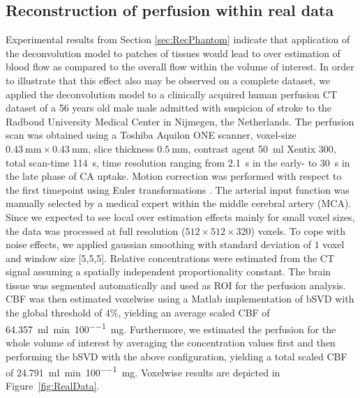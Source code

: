 \documentclass[journal,twocolumn]{IEEEtran}
\begin{document}
	
	\subsection{Reconstruction of perfusion within real data}\label{sec:RealData}
 	Experimental results from Section \ref{sec:RecPhantom} indicate that application of the deconvolution model to patches of tissues would lead to over estimation of blood flow as compared to the overall flow within the volume of interest.
	In order to illustrate that this effect also may be observed on a complete dataset, we applied the deconvolution model to a clinically acquired human perfusion CT dataset of a 56 years old male male admitted with suspicion of stroke to the Radboud University Medical Center in Nijmegen, the Netherlands.
	The perfusion scan was obtained using a Toshiba Aquilon ONE scanner, voxel-size $\SI{0.43}{\milli\meter}\times\SI{0.43}{\milli\meter}$, slice thickness $\SI{0.5}{\milli\meter}$, contrast agent \SI{50}{\milli\litre} Xentix 300, total scan-time \SI{114}{\second}, time resolution ranging from \SI{2.1}{\second} in the early- to \SI{30}{\second} in the late phase of CA uptake.
	Motion correction was performed with respect to the first timepoint using Euler transformations \cite{Mendrik11}.
	The arterial input function was manually selected by a medical expert within the middle cerebral artery (MCA).
	Since we expected to see local over estimation effects mainly for small voxel sizes, the data was processed at full resolution ($512\times512\times320$) voxels. 
	To cope with noise effects, we applied gaussian smoothing with standard deviation of $1$ voxel and window size [5,5,5].
	Relative concentrations were estimated from the CT signal assuming a spatially independent proportionality constant. 
	The brain tissue was segmented automatically and used as ROI for the perfusion analysis.
	CBF was then estimated voxelwise using a Matlab implementation of bSVD with the global threshold of $4\%$, yielding an average scaled CBF of \SI{64.357}{\milli\litre\per\minute\per100\milli\gram}.
	Furthermore, we estimated the perfusion for the whole volume of interest by averaging the concentration values first and then performing the bSVD with the above configuration, yielding a total scaled CBF of \SI{24.791}{\milli\litre\per\minute\per100\milli\gram}.
	Voxelwise results are depicted in Figure~\ref{fig:RealData}.
\end{document}
